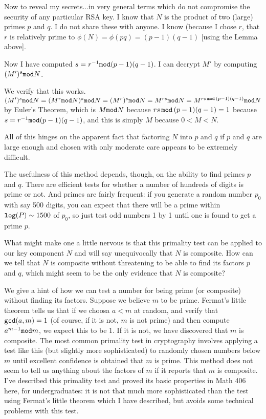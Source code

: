 \documentclass[12pt]{article}
\begin{document}
Now to reveal my secrets...in very general terms which do not compromise the security of any particular RSA key.  I know that $N$ is the product of two (large) primes $p$ and $q$.  I do not share these with anyone.  I know (because I chose $r$, that $r$ is relatively prime to $\phi(N) = \phi(pq) = (p-1)(q-1)$ [using the Lemma above].

Now I have computed $s = r^{-1} {\tt mod} (p-1)(q-1)$.  I can decrypt $M'$ by computing $(M')^s {\tt mod} N$.

We verify that this works.  $(M')^s {\tt mod}N = (M^r {\tt mod} N)^s {\tt mod} N = (M^r)^s {\tt mod} N = M^{rs} {\tt mod} N = M^{rs \,{\tt mod}\, (p-1)(q-1)} {\tt mod} N$ by Euler's Theorem, which is $M {\tt mod} N$ because $rs \, {\tt mod}\, (p-1)(q-1)= 1$ because  $s = r^{-1} {\tt mod} (p-1)(q-1)$, and this is simply $M$ because $0<M<N$.


All of this hinges  on the apparent fact that factoring $N$ into $p$ and $q$ if $p$ and $q$ are large enough and chosen with only moderate care appears to be extremely difficult.

The usefulness of this method depends, though, on the ability to find primes $p$ and $q$.  There are efficient tests for whether a number of hundreds of digits is prime or not.  And primes are fairly frequent:  if you generate a random number $p_0$ with say 500 digits, you can expect that there will be a prime within ${\tt log}(P) \sim 1500$ of $p_0$, so just test odd numbers 1 by 1 until one is found to get a prime $p$.

What might make one a little nervous is that this primality test can be applied to our key component $N$ and will say unequivocally that $N$ is composite.  How can we tell that $N$ is composite without threatening to be able to find its factors $p$ and $q$, which might seem to be the only evidence that $N$ is composite?

We give a hint of how we can test a number for being prime (or composite) without finding its factors.  Suppose we
believe $m$ to be prime.  Fermat's little theorem tells us that if we choosa $a<m$ at random, and verify that
${\tt gcd}(a,m)=1$ (of course, if it is not, $m$ is not prime) and then compute $a^{m-1} {\tt mod} m$, we expect this to be 1.  If it is not, we have discovered that $m$ is composite.  The most common primality test in cryptography involves applying a test like this (but slightly more sophisticated) to randomly chosen numbers below $m$ until excellent confidence is obtained that $m$ is prime.  This method does not seem to tell us anything about the factors of $m$ if it reports that $m$ is composite.  I've described this primality test and proved its basic properties in Math 406 here, for undergraduates:  it is not that much more sophisticated than the test using Fermat's little theorem which I have described, but avoids some technical problems with this test.
\end{document}
